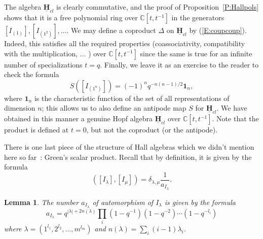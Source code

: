 \documentclass[a4paper,10pt]{amsart}
\def\H{\mathbf{H}}
\def\C{\mathbb{C}}
\newtheorem{lem}[theo]{Lemma}
\numberwithin{equation}{section}
\begin{document}
\vspace{.15in}

The algebra $\underline{\H}_{cl}$ is clearly commutative, and the proof of Proposition~\ref{P:Hallpols} shows that it is a free polynomial ring over $\C[t,t^{-1}]$ in the generators $[I_{(1)}], [I_{(1^2)}], \ldots$. We may define a coproduct $\Delta$ on $\underline{\H}_{cl}$ by (\ref{E:coupcoup}). Indeed, this satisfies all the required properties (coassociativity, compatibility with the multiplication, $\ldots$ ) over $\C[t,t^{-1}]$ since the same is true for an infinite number of specializations $t=q$. Finally, we leave it as an exercise to the reader to check the formula
$$S([I_{(1^n)}])=(-1)^n q^{-n(n-1)/2}\mathbf{1}_n,$$
where $\mathbf{1}_n$ is the characteristic function of the set of all representations of dimension $n$; this allows us to
also define an antipode map $S$ for $\underline{\H}_{cl}$. We have obtained in this manner a genuine Hopf algebra $\underline{\H}_{cl}$ over $\C[t,t^{-1}]$. Note that the product is
defined at $t=0$, but not the coproduct (or the antipode).

\vspace{.15in}

There is one last piece of the structure of Hall algebras which we didn't mention here so far~: Green's scalar product. Recall that by definition, it is given by the formula
$$([I_{\lambda}],[I_{\mu}])=\delta_{\lambda,\mu} \frac{1}{a_{I_{\lambda}}}.$$

\vspace{.1in}

\begin{lem} The number $a_{I_{\lambda}}$ of automorphism of $I_{\lambda}$ is given by the formula
\begin{equation}\label{E:HLnorm}
a_{I_{\lambda}}=q^{|\lambda| + 2 n(\lambda)}\prod_i (1-q^{-1}) (1-q^{-2}) \cdots (1-q^{-l_i})
\end{equation}
where $\lambda=(1^{l_1}, 2^{l_2}, \ldots , m^{l_m})$ and $n(\lambda)=\sum_i (i-1) \lambda_i$.
\end{lem}
\end{document}
